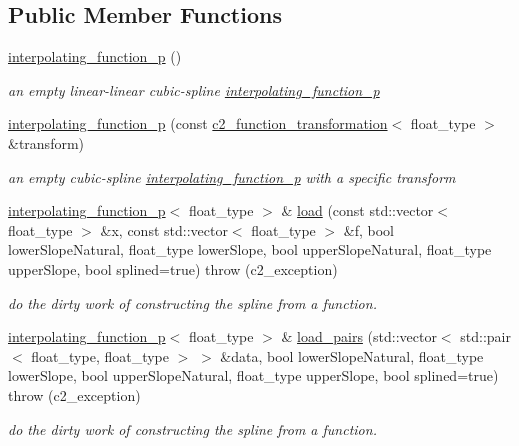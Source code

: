 \subsection*{Public Member Functions}
\begin{DoxyCompactItemize}
\item 
\hyperlink{classinterpolating__function__p_ad964e7b37271708c1d505ae3fd9c7722}{interpolating\+\_\+function\+\_\+p} ()
\begin{DoxyCompactList}\small\item\em an empty linear-\/linear cubic-\/spline \hyperlink{classinterpolating__function__p}{interpolating\+\_\+function\+\_\+p} \end{DoxyCompactList}\item 
\hyperlink{classinterpolating__function__p_aac529a5b217fb8b362e008ce2ddcfccc}{interpolating\+\_\+function\+\_\+p} (const \hyperlink{classc2__function__transformation}{c2\+\_\+function\+\_\+transformation}$<$ float\+\_\+type $>$ \&transform)
\begin{DoxyCompactList}\small\item\em an empty cubic-\/spline \hyperlink{classinterpolating__function__p}{interpolating\+\_\+function\+\_\+p} with a specific transform \end{DoxyCompactList}\item 
\hyperlink{classinterpolating__function__p}{interpolating\+\_\+function\+\_\+p}$<$ float\+\_\+type $>$ \& \hyperlink{classinterpolating__function__p_a9a5f9a3a83dcb3d8addae44e5f40e2ee}{load} (const std\+::vector$<$ float\+\_\+type $>$ \&x, const std\+::vector$<$ float\+\_\+type $>$ \&f, bool lower\+Slope\+Natural, float\+\_\+type lower\+Slope, bool upper\+Slope\+Natural, float\+\_\+type upper\+Slope, bool splined=true)  throw (c2\+\_\+exception)
\begin{DoxyCompactList}\small\item\em do the dirty work of constructing the spline from a function. \end{DoxyCompactList}\item 
\hyperlink{classinterpolating__function__p}{interpolating\+\_\+function\+\_\+p}$<$ float\+\_\+type $>$ \& \hyperlink{classinterpolating__function__p_a1cfe18539d86f381a2e91749480f237d}{load\+\_\+pairs} (std\+::vector$<$ std\+::pair$<$ float\+\_\+type, float\+\_\+type $>$ $>$ \&data, bool lower\+Slope\+Natural, float\+\_\+type lower\+Slope, bool upper\+Slope\+Natural, float\+\_\+type upper\+Slope, bool splined=true)  throw (c2\+\_\+exception)
\begin{DoxyCompactList}\small\item\em do the dirty work of constructing the spline from a function. \end{DoxyCompactList}\item 

\end{DoxyCompactItemize}
